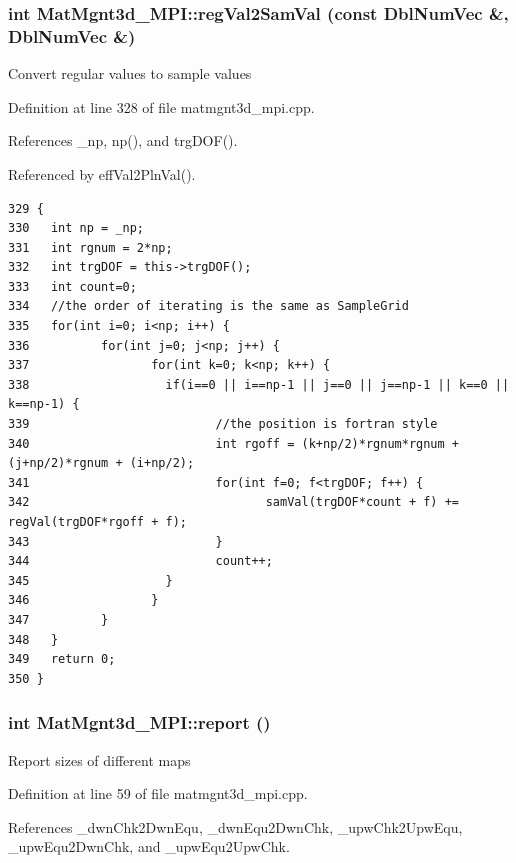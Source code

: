 \subsubsection{\setlength{\rightskip}{0pt plus 5cm}int Mat\-Mgnt3d\_\-MPI::reg\-Val2Sam\-Val (const Dbl\-Num\-Vec \&, Dbl\-Num\-Vec \&)}\label{classMatMgnt3d__MPI_157f482e203a0f8c33570e8f0fbccdc4_157f482e203a0f8c33570e8f0fbccdc4}


Convert regular values to sample values 

Definition at line 328 of file matmgnt3d\_\-mpi.cpp.

References \_\-np, np(), and trg\-DOF().

Referenced by eff\-Val2Pln\-Val().

\footnotesize\begin{verbatim}329 {
330   int np = _np;
331   int rgnum = 2*np;
332   int trgDOF = this->trgDOF();
333   int count=0;
334   //the order of iterating is the same as SampleGrid
335   for(int i=0; i<np; i++) {
336          for(int j=0; j<np; j++) {
337                 for(int k=0; k<np; k++) {
338                   if(i==0 || i==np-1 || j==0 || j==np-1 || k==0 || k==np-1) {
339                          //the position is fortran style
340                          int rgoff = (k+np/2)*rgnum*rgnum + (j+np/2)*rgnum + (i+np/2);
341                          for(int f=0; f<trgDOF; f++) {
342                                 samVal(trgDOF*count + f) += regVal(trgDOF*rgoff + f);
343                          }
344                          count++;
345                   }
346                 }
347          }
348   }
349   return 0;
350 }
\end{verbatim}\normalsize 


\subsubsection{\setlength{\rightskip}{0pt plus 5cm}int Mat\-Mgnt3d\_\-MPI::report ()}\label{classMatMgnt3d__MPI_ae2b28144bd345f29a29ecd1b43d62b7_ae2b28144bd345f29a29ecd1b43d62b7}


Report sizes of different maps 

Definition at line 59 of file matmgnt3d\_\-mpi.cpp.

References \_\-dwn\-Chk2Dwn\-Equ, \_\-dwn\-Equ2Dwn\-Chk, \_\-upw\-Chk2Upw\-Equ, \_\-upw\-Equ2Dwn\-Chk, and \_\-upw\-Equ2Upw\-Chk.

